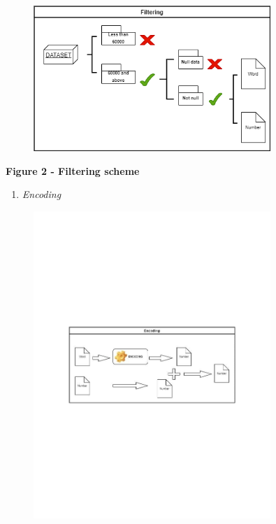 \begin{figure}[H]
	\centering
	\includegraphics[width=0.8\textwidth]{media/ict/image18}
	\caption*{}
\end{figure}


{\bfseries Figure 2 - Filtering scheme}

\begin{enumerate}
\def\labelenumi{\Alph{enumi}.}
\setcounter{enumi}{2}
\item
  \emph{Encoding}
\end{enumerate}

\begin{figure}[H]
	\centering
	\includegraphics[width=0.8\textwidth]{media/ict/image19}
	\caption*{}
\end{figure}


